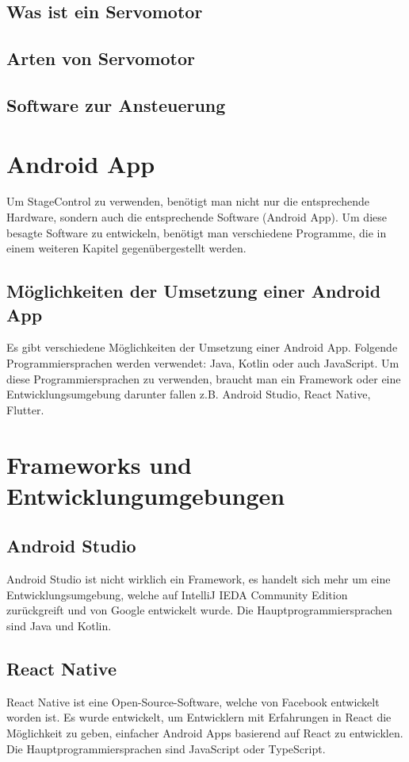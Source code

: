 \subsection{Was ist ein Servomotor}
\subsection{Arten von Servomotor}
\subsection{Software zur Ansteuerung}


\section{Android App}
Um StageControl zu verwenden, benötigt man nicht nur die entsprechende Hardware, sondern auch die entsprechende Software (Android App). Um diese besagte Software zu entwickeln, benötigt man verschiedene Programme, die in einem weiteren Kapitel gegenübergestellt werden.

\subsection{Möglichkeiten der Umsetzung einer Android App}
Es gibt verschiedene Möglichkeiten der Umsetzung einer Android App. Folgende Programmiersprachen werden verwendet: Java, Kotlin oder auch JavaScript. Um diese Programmiersprachen zu verwenden, braucht man ein Framework oder eine Entwicklungsumgebung darunter fallen z.B. Android Studio, React Native, Flutter.

\section{Frameworks und Entwicklungumgebungen}
\subsection{Android Studio}
Android Studio ist nicht wirklich ein Framework, es handelt sich mehr um eine Entwicklungsumgebung, welche auf IntelliJ IEDA Community Edition zurückgreift und von Google entwickelt wurde. Die Hauptprogrammiersprachen sind Java und Kotlin. \cite{Android Studio}

\subsection{React Native}
React Native ist eine Open-Source-Software, welche von Facebook entwickelt worden ist. Es wurde entwickelt, um Entwicklern mit Erfahrungen in React die Möglichkeit zu geben, einfacher Android Apps basierend auf React zu entwicklen. Die Hauptprogrammiersprachen sind JavaScript oder TypeScript. \cite{React Native}

